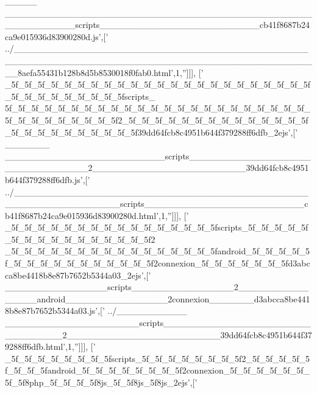 \begin{DoxyCode}
{      \_\_\_\_\_
      \_\_\_\_\_\_\_\_\_\_\_\_\_\_\_\_\_\_\_\_\_\_\_\_\_\_\_\_\_\_\_\_\_\_\_\_\_\_\_\_\_\_\_\_\_\_\_\_\_\_\_\_\_\_\_\_\_\_\_scripts\_\_\_\_\_\_\_\_\_\_\_\_\_\_\_\_\_\_\_\_\_\_\_\_\_cb41f8687b24ca9e015936d83900280d.js'},[\textcolor{stringliteral}{'
      ../\_\_\_\_\_\_\_\_\_\_\_\_\_\_\_\_\_\_\_\_\_\_\_\_\_\_\_\_\_\_\_\_\_\_\_\_\_\_\_\_\_\_\_\_\_\_\_\_\_\_\_\_\_\_\_\_\_\_\_\_\_\_\_\_\_\_\_\_\_\_\_\_\_\_\_\_\_\_\_\_\_\_\_\_\_\_\_\_\_\_\_\_\_\_\_\_8aefa55431b128b8d5b8530018f0fab0.html'},1,\textcolor{stringliteral}{''}]]],
  [\textcolor{stringliteral}{'
      \_5f\_5f\_5f\_5f\_5f\_5f\_5f\_5f\_5f\_5f\_5f\_5f\_5f\_5f\_5f\_5f\_5f\_5f\_5f\_5f\_5f\_5f\_5f\_5f\_5f\_5f\_5f\_5f\_5f\_5f\_5f\_5fscripts\_
      5f\_5f\_5f\_5f\_5f\_5f\_5f\_5f\_5f\_5f\_5f\_5f\_5f\_5f\_5f\_5f\_5f\_5f\_5f\_5f\_5f\_5f\_5f\_5f\_5f\_5f\_5f\_5f\_5f\_5f\_5f\_5f2\_5f\_5f\_5f\_5f\_5f\_5f\_5f\_5f\_5f\_5f\_5f\_5f\_5f\_5f\_5f\_5f\_5f\_5f\_5f\_5f\_5f\_5f\_5f\_5f39dd64fcb8c4951b644f379288ff6dfb\_2ejs'},[\textcolor{stringliteral}{'
      \_\_\_\_\_\_\_
      \_\_\_\_\_\_\_\_\_\_\_\_\_\_\_\_\_\_\_\_\_\_\_\_\_scripts\_\_\_\_\_\_\_\_\_\_\_\_\_\_\_\_\_\_\_\_\_\_\_\_\_\_\_\_\_\_\_\_2\_\_\_\_\_\_\_\_\_\_\_\_\_\_\_\_\_\_\_\_\_\_\_\_39dd64fcb8c4951b644f379288ff6dfb.js'},[\textcolor{stringliteral}{'
      ../\_\_\_\_\_\_\_\_\_\_\_\_\_\_\_\_\_\_\_\_\_\_\_\_\_\_\_\_\_\_\_\_\_\_\_\_\_\_\_\_\_\_\_\_\_\_\_\_\_\_\_\_\_\_\_\_\_\_\_\_\_\_\_\_scripts\_\_\_\_\_\_\_\_\_\_\_\_\_\_\_\_\_\_\_\_\_\_\_\_\_cb41f8687b24ca9e015936d83900280d.html'},1,\textcolor{stringliteral}{''}]]],
  [\textcolor{stringliteral}{'
      \_5f\_5f\_5f\_5f\_5f\_5f\_5f\_5f\_5f\_5f\_5f\_5f\_5f\_5f\_5f\_5fscripts\_5f\_5f\_5f\_5f\_5f\_5f\_5f\_5f\_5f\_5f\_5f\_5f\_5f\_5f\_5f\_5f2
      \_5f\_5f\_5f\_5f\_5f\_5f\_5f\_5f\_5f\_5f\_5f\_5f\_5f\_5f\_5f\_5fandroid\_5f\_5f\_5f\_5f\_5f\_5f\_5f\_5f\_5f\_5f\_5f\_5f\_5f\_5f\_5f\_5f2connexion\_5f\_5f\_5f\_5f\_5f\_5f\_5fd3abcca8be4418b8e87b7652b5344a03\_2ejs'},[\textcolor{stringliteral}{'
      \_\_\_\_\_\_\_\_\_\_\_\_\_\_\_\_scripts\_\_\_\_\_\_\_\_\_\_\_\_\_\_\_\_2\_\_\_\_\_\_\_\_\_\_\_\_\_\_\_\_android\_\_\_\_\_\_\_\_\_\_\_\_\_\_\_\_2connexion\_\_\_\_\_\_\_d3abcca8be4418b8e87b7652b5344a03.js'},[\textcolor{stringliteral}{'
      ../\_\_\_\_\_\_\_\_\_\_\_
      \_\_\_\_\_\_\_\_\_\_\_\_\_\_\_\_\_\_\_\_\_scripts\_\_\_\_\_\_\_\_\_\_\_\_\_\_\_\_\_\_\_\_\_\_\_\_\_\_\_\_\_\_\_\_2\_\_\_\_\_\_\_\_\_\_\_\_\_\_\_\_\_\_\_\_\_\_\_\_39dd64fcb8c4951b644f379288ff6dfb.html'},1,\textcolor{stringliteral}{''}]]],
  [\textcolor{stringliteral}{'
      \_5f\_5f\_5f\_5f\_5f\_5f\_5f\_5fscripts\_5f\_5f\_5f\_5f\_5f\_5f\_5f\_5f2\_5f\_5f\_5f\_5f\_5f\_5f\_5f\_5fandroid\_5f\_5f\_5f\_5f\_5f\_5f\_5f\_5f2connexion\_5f\_5f\_5f\_5f\_5f\_5f\_5f\_5f8php\_5f\_5f\_5f\_5f8js\_5f\_5f8js\_5f8js\_2ejs'},[\textcolor{stringliteral}{'
}
\end{DoxyCode}
